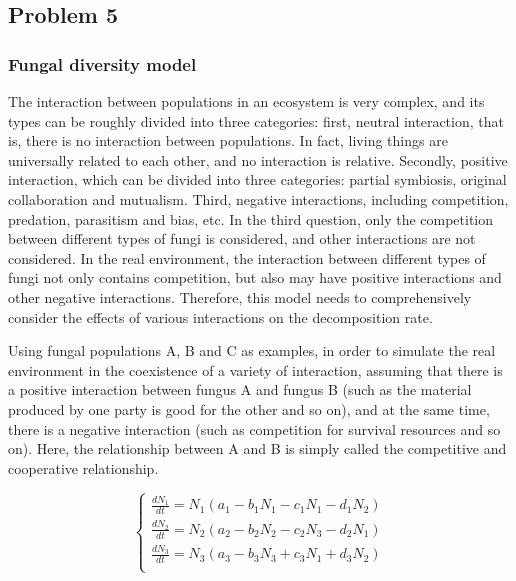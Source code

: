 \subsection{Problem 5}
\subsubsection{Fungal diversity model}

The interaction between populations in an ecosystem is very complex, and its types can be roughly divided into three categories: first, neutral interaction, that is, there is no interaction between populations. In fact, living things are universally related to each other, and no interaction is relative. Secondly, positive interaction, which can be divided into three categories: partial symbiosis, original collaboration and mutualism. Third, negative interactions, including competition, predation, parasitism and bias, etc. In the third question, only the competition between different types of fungi is considered, and other interactions are not considered. In the real environment, the interaction between different types of fungi not only contains competition, but also may have positive interactions and other negative interactions. Therefore, this model needs to comprehensively consider the effects of various interactions on the decomposition rate.

Using fungal populations A, B and C as examples, in order to simulate the real environment in the coexistence of a variety of interaction, assuming that there is a positive interaction between fungus A and fungus B (such as the material produced by one party is good for the other and so on), and at the same time, there is a negative interaction (such as competition for survival resources and so on). Here, the relationship between A and B is simply called the competitive and cooperative relationship.

\begin{equation}\label{5.1}
    \left\{
    \begin{array}{l}
        \frac{dN_{1}}{dt}=N_{1}(a_{1}-b_{1}N_{1}-c_{1}N_{1}-d_{1}N_{2}) \\
        \frac{dN_{2}}{dt}=N_{2}(a_{2}-b_{2}N_{2}-c_{2}N_{3}-d_{2}N_{1}) \\
        \frac{dN_{3}}{dt}=N_{3}(a_{3}-b_{3}N_{3}+c_{3}N_{1}+d_{3}N_{2}) \\
    \end{array}
    \right.
    \end{equation}

